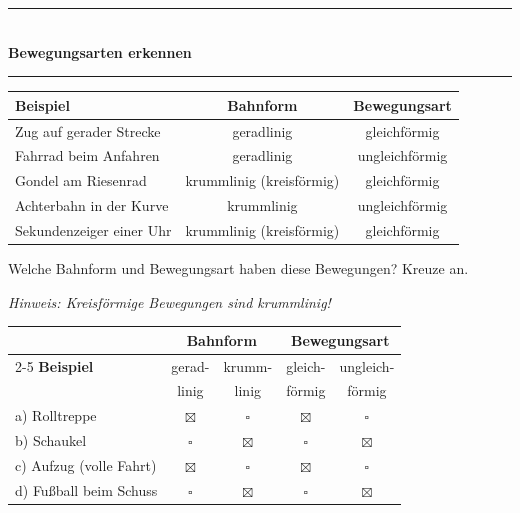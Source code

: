 \documentclass[11pt, a4paper]{article}
\newcommand{\seitentitel}[1]{%
    \noindent\textcolor{physik}{\rule{\textwidth}{2pt}}\\[0.3em]
    {\LARGE\bfseries\textcolor{physik}{#1}}\\[0.2em]
    \textcolor{physik}{\rule{\textwidth}{0.5pt}}
    \vspace{0.5em}
}
\newcommand{\abschnitt}[1]{%
    \vspace{8pt}%
    \noindent{\large\bfseries\textcolor{physik}{#1}}%
    \vspace{4pt}%
}
\newcommand{\lsg}[1]{\textcolor{loesung}{\underline{\textbf{#1}}}}
\begin{document}

\newpage

\seitentitel{Bewegungsarten erkennen}

\abschnitt{4. Beispiele aus dem Alltag}

\begin{center}
\renewcommand{\arraystretch}{1.4}
\begin{tabular}{|p{4.5cm}|c|c|}
\hline
\textbf{Beispiel} & \textbf{Bahnform} & \textbf{Bewegungsart} \\
\hline
Zug auf gerader Strecke & geradlinig & gleichförmig \\
\hline
Fahrrad beim Anfahren & geradlinig & ungleichförmig \\
\hline
Gondel am Riesenrad & krummlinig (kreisförmig) & gleichförmig \\
\hline
Achterbahn in der Kurve & krummlinig & ungleichförmig \\
\hline
Sekundenzeiger einer Uhr & krummlinig (kreisförmig) & gleichförmig \\
\hline
\end{tabular}
\end{center}

\vspace{0.5em}

\abschnitt{5. Übung: Ordne zu!}

Welche Bahnform und Bewegungsart haben diese Bewegungen? Kreuze an.

\textit{Hinweis: Kreisförmige Bewegungen sind krummlinig!}

\begin{center}
\renewcommand{\arraystretch}{1.6}
\begin{tabular}{|p{3.5cm}|c|c|c|c|}
\hline
& \multicolumn{2}{c|}{\textbf{Bahnform}} & \multicolumn{2}{c|}{\textbf{Bewegungsart}} \\
\cline{2-5}
\textbf{Beispiel} & gerad- & krumm- & gleich- & ungleich- \\
& linig & linig & förmig & förmig \\
\hline
a) Rolltreppe & \lsg{$\boxtimes$} & $\square$ & \lsg{$\boxtimes$} & $\square$ \\
\hline
b) Schaukel & $\square$ & \lsg{$\boxtimes$} & $\square$ & \lsg{$\boxtimes$} \\
\hline
c) Aufzug (volle Fahrt) & \lsg{$\boxtimes$} & $\square$ & \lsg{$\boxtimes$} & $\square$ \\
\hline
d) Fußball beim Schuss & $\square$ & \lsg{$\boxtimes$} & $\square$ & \lsg{$\boxtimes$} \\
\hline
\end{tabular}
\end{center}
\end{document}
